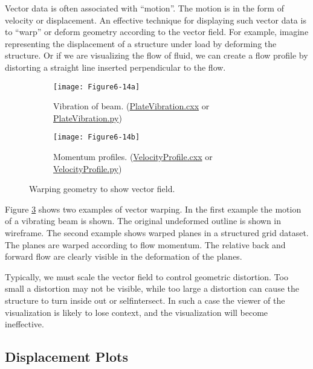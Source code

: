 Vector data is often associated with ``motion''. The motion is in the form of velocity or displacement. An effective technique for displaying such vector data is to ``warp'' or deform geometry according to the vector field. For example, imagine representing the displacement of a structure under load by deforming the structure. Or if we are visualizing the flow of fluid, we can create a flow profile by distorting a straight line inserted perpendicular to the flow.

\begin{figure}[htb]
	\begin{subfigure}[h]{0.48\linewidth}
	\texttt{[image: Figure6-14a]}
	\caption{Vibration of beam. (\href{https://lorensen.github.io/VTKExamples/site/Cxx/VisualizationAlgorithms/PlateVibration}{PlateVibration.cxx} or \href{https://lorensen.github.io/VTKExamples/site/Python/VisualizationAlgorithms/PlateVibration/}{PlateVibration.py})}\label{fig:Figure6-14a}
\end{subfigure}
	\hfill
	\begin{subfigure}[h]{0.48\linewidth}
		\texttt{[image: Figure6-14b]}
		\caption{Momentum profiles. (\href{https://lorensen.github.io/VTKExamples/site/Cxx/VisualizationAlgorithms/VelocityProfile}{VelocityProfile.cxx} or \href{https://lorensen.github.io/VTKExamples/site/Python/VisualizationAlgorithms/VelocityProfile/}{VelocityProfile.py})}\label{fig:Figure6-14b}
	\end{subfigure}
	\caption{Warping geometry to show vector field.}\label{fig:Figure6-14}
\end{figure}

Figure \ref{fig:Figure6-14} shows two examples of vector warping. In the first example the motion of a vibrating beam is shown. The original undeformed outline is shown in wireframe. The second example shows warped planes in a structured grid dataset. The planes are warped according to flow momentum. The relative back and forward flow are clearly visible in the deformation of the planes.

Typically, we must scale the vector field to control geometric distortion. Too small a distortion may not be visible, while too large a distortion can cause the structure to turn inside out or selfintersect. In such a case the viewer of the visualization is likely to lose context, and the visualization will become ineffective.

\subsection{Displacement Plots}
\label{subsec:displacement_plots}

